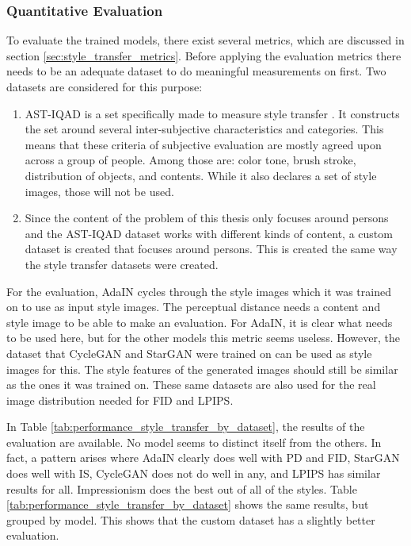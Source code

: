 \subsubsection{Quantitative Evaluation}
To evaluate the trained models, there exist several metrics, which are discussed in section \ref{sec:style_transfer_metrics}.
Before applying the evaluation metrics there needs to be an adequate dataset to do meaningful measurements on first.
Two datasets are considered for this purpose:
\begin{enumerate}
    \item \gls{AST-IQAD} is a set specifically made to measure style transfer \cite{Chen2023}.
    It constructs the set around several inter-subjective characteristics and categories.
    This means that these criteria of subjective evaluation are mostly agreed upon across a group of people.
    Among those are: color tone, brush stroke, distribution of objects, and contents.
    While it also declares a set of style images, those will not be used.
    \item Since the content of the problem of this thesis only focuses around persons and the \gls{AST-IQAD} dataset works with different kinds of content, a custom dataset is created that focuses around persons.
    This is created the same way the style transfer datasets were created.
\end{enumerate}
For the evaluation, AdaIN cycles through the style images which it was trained on to use as input style images.
The perceptual distance needs a content and style image to be able to make an evaluation.
For AdaIN, it is clear what needs to be used here, but for the other models this metric seems useless.
However, the dataset that CycleGAN and StarGAN were trained on can be used as style images for this.
The style features of the generated images should still be similar as the ones it was trained on.
These same datasets are also used for the real image distribution needed for \gls{FID} and \gls{LPIPS}.

In Table \ref{tab:performance_style_transfer_by_dataset}, the results of the evaluation are available.
No model seems to distinct itself from the others.
In fact, a pattern arises where AdaIN clearly does well with \gls{PD} and {FID}, StarGAN does well with \gls{IS}, CycleGAN does not do well in any, and \gls{LPIPS} has similar results for all.
Impressionism does the best out of all of the styles.
Table \ref{tab:performance_style_transfer_by_dataset} shows the same results, but grouped by model.
This shows that the custom dataset has a slightly better evaluation.

